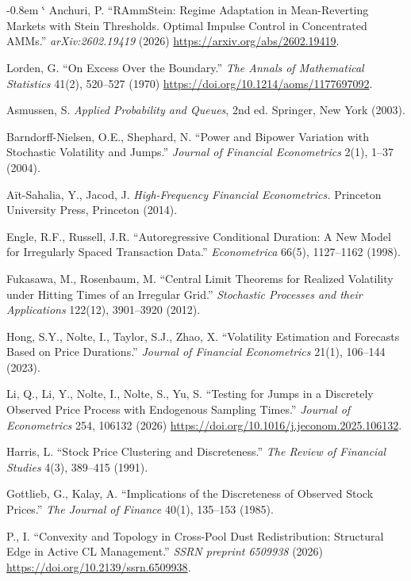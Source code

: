 \documentclass[11pt,a4paper]{article}
\makeatletter
\renewenvironment{thebibliography}[1]
  {\section*{\refname}%
   \fontsize{10pt}{12pt}\selectfont
   \list{\@biblabel{\@arabic\c@enumiv}}%
        {\settowidth\labelwidth{\@biblabel{#1}}%
         \leftmargin\labelwidth
         \advance\leftmargin-0.8em
         \advance\leftmargin\labelsep
         \setlength\itemindent{1em}%
         \setlength\itemsep{6pt plus 1pt minus 1pt}%
         \setlength\parsep{0pt}%
         \usecounter{enumiv}%
         \let\p@enumiv\@empty
         \renewcommand\theenumiv{\@arabic\c@enumiv}}%
   \sloppy\clubpenalty4000\widowpenalty4000\sfcode`\.\@m}
  {\def\@noitemerr{\@latex@warning{Empty `thebibliography' environment}}%
   \endlist}
\theoremstyle{definition}
\theoremstyle{plain}
\theoremstyle{remark}
\makeatother
\begin{document}
\begin{thebibliography}{45}
Anchuri, P. ``RAmmStein: Regime Adaptation in Mean-Reverting Markets with Stein Thresholds. Optimal Impulse Control in Concentrated AMMs.'' \emph{arXiv:2602.19419} (2026) \url{https://arxiv.org/abs/2602.19419}.

Lorden, G. ``On Excess Over the Boundary.'' \emph{The Annals of Mathematical Statistics} 41(2), 520--527 (1970) \url{https://doi.org/10.1214/aoms/1177697092}.

Asmussen, S. \emph{Applied Probability and Queues}, 2nd ed. Springer, New York (2003).

Barndorff-Nielsen, O.E., Shephard, N. ``Power and Bipower Variation with Stochastic Volatility and Jumps.'' \emph{Journal of Financial Econometrics} 2(1), 1--37 (2004).

A\"it-Sahalia, Y., Jacod, J. \emph{High-Frequency Financial Econometrics.} Princeton University Press, Princeton (2014).

Engle, R.F., Russell, J.R. ``Autoregressive Conditional Duration: A New Model for Irregularly Spaced Transaction Data.'' \emph{Econometrica} 66(5), 1127--1162 (1998).

Fukasawa, M., Rosenbaum, M. ``Central Limit Theorems for Realized Volatility under Hitting Times of an Irregular Grid.'' \emph{Stochastic Processes and their Applications} 122(12), 3901--3920 (2012).

Hong, S.Y., Nolte, I., Taylor, S.J., Zhao, X. ``Volatility Estimation and Forecasts Based on Price Durations.'' \emph{Journal of Financial Econometrics} 21(1), 106--144 (2023).

Li, Q., Li, Y., Nolte, I., Nolte, S., Yu, S. ``Testing for Jumps in a Discretely Observed Price Process with Endogenous Sampling Times.'' \emph{Journal of Econometrics} 254, 106132 (2026) \url{https://doi.org/10.1016/j.jeconom.2025.106132}.

Harris, L. ``Stock Price Clustering and Discreteness.'' \emph{The Review of Financial Studies} 4(3), 389--415 (1991).

Gottlieb, G., Kalay, A. ``Implications of the Discreteness of Observed Stock Prices.'' \emph{The Journal of Finance} 40(1), 135--153 (1985).

P., I. ``Convexity and Topology in Cross-Pool Dust Redistribution: Structural Edge in Active CL Management.'' \emph{SSRN preprint 6509938} (2026) \url{https://doi.org/10.2139/ssrn.6509938}.


\end{thebibliography}
\end{document}
